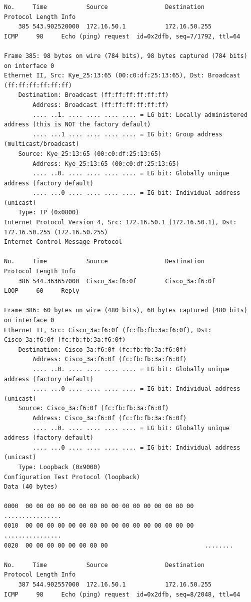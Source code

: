 \documentclass[a4paper,11pt]{article}
\begin{document}
\begin{lstlisting}
No.     Time           Source                Destination           Protocol Length Info
    385 543.902520000  172.16.50.1           172.16.50.255         ICMP     98     Echo (ping) request  id=0x2dfb, seq=7/1792, ttl=64

Frame 385: 98 bytes on wire (784 bits), 98 bytes captured (784 bits) on interface 0
Ethernet II, Src: Kye_25:13:65 (00:c0:df:25:13:65), Dst: Broadcast (ff:ff:ff:ff:ff:ff)
    Destination: Broadcast (ff:ff:ff:ff:ff:ff)
        Address: Broadcast (ff:ff:ff:ff:ff:ff)
        .... ..1. .... .... .... .... = LG bit: Locally administered address (this is NOT the factory default)
        .... ...1 .... .... .... .... = IG bit: Group address (multicast/broadcast)
    Source: Kye_25:13:65 (00:c0:df:25:13:65)
        Address: Kye_25:13:65 (00:c0:df:25:13:65)
        .... ..0. .... .... .... .... = LG bit: Globally unique address (factory default)
        .... ...0 .... .... .... .... = IG bit: Individual address (unicast)
    Type: IP (0x0800)
Internet Protocol Version 4, Src: 172.16.50.1 (172.16.50.1), Dst: 172.16.50.255 (172.16.50.255)
Internet Control Message Protocol

No.     Time           Source                Destination           Protocol Length Info
    386 544.363657000  Cisco_3a:f6:0f        Cisco_3a:f6:0f        LOOP     60     Reply

Frame 386: 60 bytes on wire (480 bits), 60 bytes captured (480 bits) on interface 0
Ethernet II, Src: Cisco_3a:f6:0f (fc:fb:fb:3a:f6:0f), Dst: Cisco_3a:f6:0f (fc:fb:fb:3a:f6:0f)
    Destination: Cisco_3a:f6:0f (fc:fb:fb:3a:f6:0f)
        Address: Cisco_3a:f6:0f (fc:fb:fb:3a:f6:0f)
        .... ..0. .... .... .... .... = LG bit: Globally unique address (factory default)
        .... ...0 .... .... .... .... = IG bit: Individual address (unicast)
    Source: Cisco_3a:f6:0f (fc:fb:fb:3a:f6:0f)
        Address: Cisco_3a:f6:0f (fc:fb:fb:3a:f6:0f)
        .... ..0. .... .... .... .... = LG bit: Globally unique address (factory default)
        .... ...0 .... .... .... .... = IG bit: Individual address (unicast)
    Type: Loopback (0x9000)
Configuration Test Protocol (loopback)
Data (40 bytes)

0000  00 00 00 00 00 00 00 00 00 00 00 00 00 00 00 00   ................
0010  00 00 00 00 00 00 00 00 00 00 00 00 00 00 00 00   ................
0020  00 00 00 00 00 00 00 00                           ........

No.     Time           Source                Destination           Protocol Length Info
    387 544.902557000  172.16.50.1           172.16.50.255         ICMP     98     Echo (ping) request  id=0x2dfb, seq=8/2048, ttl=64


\end{lstlisting}
\end{document}
